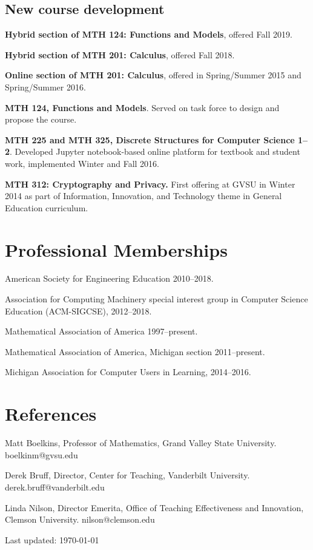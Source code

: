 \documentclass[letterpaper]{article}
\def\footerlink{}
\renewenvironment{itemize}{
  \begin{list}{}{
    \setlength{\leftmargin}{1.5em}
	\setlength{\itemsep}{0in}
  }
}{
  \end{list}
}
\begin{document}
\subsection*{New course development}
\begin{itemize}
	\item \textbf{Hybrid section of MTH 124: Functions and Models}, offered Fall 2019. 
	\item \textbf{Hybrid section of MTH 201: Calculus}, offered Fall 2018. 
	\item \textbf{Online section of MTH 201: Calculus}, offered in Spring/Summer 2015 and Spring/Summer 2016.
	\item \textbf{MTH 124, Functions and Models}. Served on task force to design and propose the course.
	\item \textbf{MTH 225 and MTH 325, Discrete Structures for Computer Science 1--2}. Developed Jupyter notebook-based online platform for textbook and student work, implemented Winter and Fall 2016.
	\item \textbf{MTH 312: Cryptography and Privacy. }First offering at GVSU in Winter 2014 as part of Information, Innovation, and Technology theme in General Education curriculum.
\end{itemize}


\section*{Professional Memberships}
\begin{itemize}
	\item American Society for Engineering Education 2010--2018.
	\item Association for Computing Machinery special interest group in Computer Science Education (ACM-SIGCSE), 2012--2018.
	\item Mathematical Association of America 1997--present.
	\item Mathematical Association of America, Michigan section 2011--present.
	\item Michigan Association for Computer Users in Learning, 2014--2016.
\end{itemize}


\section*{References}
\begin{itemize}
	\item Matt Boelkins, Professor of Mathematics, Grand Valley State University. boelkinm@gvsu.edu
	\item Derek Bruff, Director, Center for Teaching, Vanderbilt University. derek.bruff@vanderbilt.edu
	\item Linda Nilson, Director Emerita, Office of Teaching Effectiveness and Innovation, Clemson University. nilson@clemson.edu  
\end{itemize}



\bigskip

\begin{center}
  \begin{footnotesize}
    Last updated: \today \\
  \end{footnotesize}
\end{center}
\end{document}
